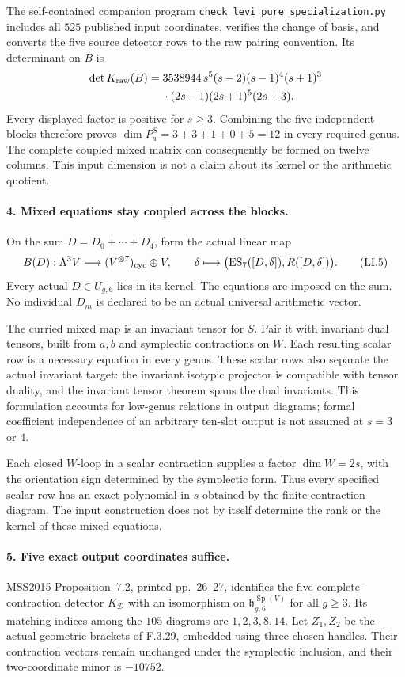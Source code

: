 The self-contained companion program
\texttt{check\_levi\_pure\_specialization.py}
includes all $525$ published input coordinates, verifies the
change of basis, and converts the five source detector rows
to the raw pairing convention. Its determinant on $B$ is
\[
\begin{aligned}
 \det K_{\rm raw}(B)
  ={}&3538944\,s^5(s-2)(s-1)^4(s+1)^3\\
    &\cdot(2s-1)(2s+1)^5(2s+3).
\end{aligned}
\]
Every displayed factor is positive for $s\geq3$. Combining the
five independent blocks therefore proves
$\dim P_a^S=3+3+1+0+5=12$ in every required genus.
The complete coupled mixed matrix can consequently be formed
on twelve columns. This input dimension is not a claim about
its kernel or the arithmetic quotient.

\paragraph{4. Mixed equations stay coupled across the blocks.}
On the sum $D=D_0+\cdots+D_4$, form the actual linear map
\[
 B(D):\Lambda^3V\longrightarrow
       (V^{\otimes7})_{\rm cyc}\oplus V,\qquad
 \delta\longmapsto
   \bigl(\operatorname{ES}_7([D,\delta]),R([D,\delta])\bigr).
                                                               \tag{LI.5}
\]
Every actual $D\in U_{g,6}$ lies in its kernel. The equations
are imposed on the sum. No individual $D_m$ is declared
to be an actual universal arithmetic vector.

The curried mixed map is an invariant tensor for $S$.
Pair it with invariant dual tensors, built from $a,b$
and symplectic contractions on $W$. Each resulting scalar
row is a necessary equation in every genus. These scalar
rows also separate the actual invariant target: the
invariant isotypic projector is compatible with tensor
duality, and the invariant tensor theorem spans the dual
invariants. This formulation accounts for low-genus
relations in output diagrams; formal coefficient
independence of an arbitrary ten-slot output is not
assumed at $s=3$ or $4$.

Each closed $W$-loop in a scalar contraction supplies a
factor $\dim W=2s$, with the orientation sign determined
by the symplectic form. Thus every specified scalar
row has an exact polynomial in $s$ obtained by the
finite contraction diagram. The input construction
does not by itself determine the rank or the kernel
of these mixed equations.

\paragraph{5. Five exact output coordinates suffice.}
MSS2015 Proposition~7.2, printed pp.~26--27, identifies
the five complete-contraction detector $K_{\mathcal D}$
with an isomorphism on
$\mathfrak h_{g,6}^{\operatorname{Sp}(V)}$ for all $g\geq3$.
Its matching indices among the $105$ diagrams are
$1,2,3,8,14$. Let $Z_1,Z_2$ be the actual geometric
brackets of F.3.29, embedded using three chosen handles.
Their contraction vectors remain unchanged under the
symplectic inclusion, and their two-coordinate minor
is $-10752$.

